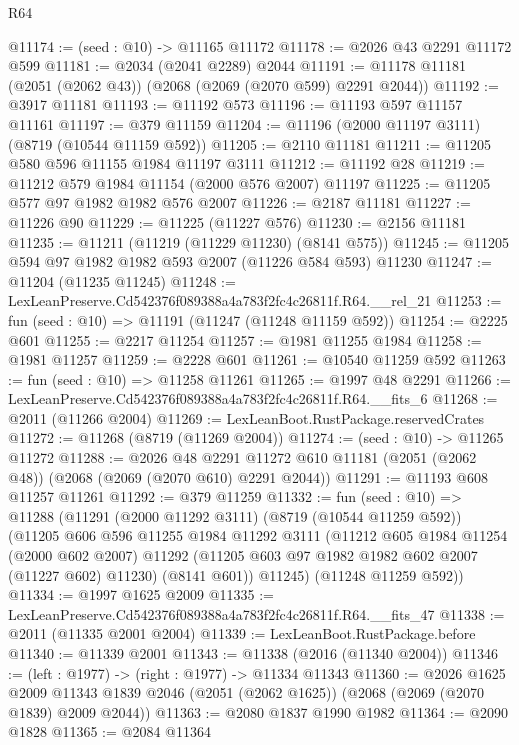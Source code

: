 \begin{lexlean}{R64}
\begin{coremodule}
@11174 := (seed : @10) -> @11165 @11172
@11178 := @2026 @43 @2291 @11172 @599
@11181 := @2034 (@2041 @2289) @2044
@11191 := @11178 @11181 (@2051 (@2062 @43)) (@2068 (@2069 (@2070 @599) @2291 @2044))
@11192 := @3917 @11181
@11193 := @11192 @573
@11196 := @11193 @597 @11157 @11161
@11197 := @379 @11159
@11204 := @11196 (@2000 @11197 @3111) (@8719 (@10544 @11159 @592))
@11205 := @2110 @11181
@11211 := @11205 @580 @596 @11155 @1984 @11197 @3111
@11212 := @11192 @28
@11219 := @11212 @579 @1984 @11154 (@2000 @576 @2007) @11197
@11225 := @11205 @577 @97 @1982 @1982 @576 @2007
@11226 := @2187 @11181
@11227 := @11226 @90
@11229 := @11225 (@11227 @576)
@11230 := @2156 @11181
@11235 := @11211 (@11219 (@11229 @11230) (@8141 @575))
@11245 := @11205 @594 @97 @1982 @1982 @593 @2007 (@11226 @584 @593) @11230
@11247 := @11204 (@11235 @11245)
@11248 := LexLeanPreserve.Cd542376f089388a4a783f2fc4c26811f.R64.__rel_21
@11253 := fun (seed : @10) => @11191 (@11247 (@11248 @11159 @592))
@11254 := @2225 @601
@11255 := @2217 @11254
@11257 := @1981 @11255 @1984
@11258 := @1981 @11257
@11259 := @2228 @601
@11261 := @10540 @11259 @592
@11263 := fun (seed : @10) => @11258 @11261
@11265 := @1997 @48 @2291
@11266 := LexLeanPreserve.Cd542376f089388a4a783f2fc4c26811f.R64.__fits_6
@11268 := @2011 (@11266 @2004)
@11269 := LexLeanBoot.RustPackage.reservedCrates
@11272 := @11268 (@8719 (@11269 @2004))
@11274 := (seed : @10) -> @11265 @11272
@11288 := @2026
    @48
    @2291
    @11272
    @610
    @11181
    (@2051 (@2062 @48))
    (@2068 (@2069 (@2070 @610) @2291 @2044))
@11291 := @11193 @608 @11257 @11261
@11292 := @379 @11259
@11332 := fun (seed : @10) =>
  @11288
    (@11291
      (@2000 @11292 @3111)
      (@8719 (@10544 @11259 @592))
      (@11205
        @606
        @596
        @11255
        @1984
        @11292
        @3111
        (@11212
          @605
          @1984
          @11254
          (@2000 @602 @2007)
          @11292
          (@11205 @603 @97 @1982 @1982 @602 @2007 (@11227 @602) @11230)
          (@8141 @601))
        @11245)
      (@11248 @11259 @592))
@11334 := @1997 @1625 @2009
@11335 := LexLeanPreserve.Cd542376f089388a4a783f2fc4c26811f.R64.__fits_47
@11338 := @2011 (@11335 @2001 @2004)
@11339 := LexLeanBoot.RustPackage.before
@11340 := @11339 @2001
@11343 := @11338 (@2016 (@11340 @2004))
@11346 := (left : @1977) -> (right : @1977) -> @11334 @11343
@11360 := @2026
    @1625
    @2009
    @11343
    @1839
    @2046
    (@2051 (@2062 @1625))
    (@2068 (@2069 (@2070 @1839) @2009 @2044))
@11363 := @2080 @1837 @1990 @1982
@11364 := @2090 @1828
@11365 := @2084 @11364

\end{coremodule}
\end{lexlean}
